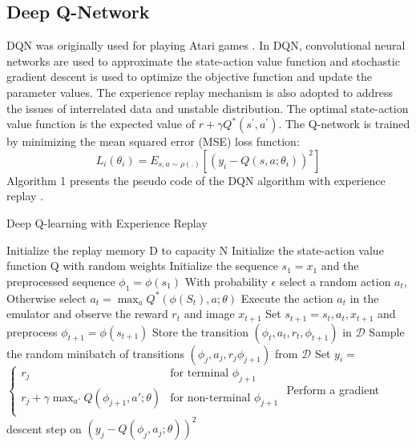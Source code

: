 \documentclass[journal]{IEEEtran}
\begin{document}
\subsection{Deep Q-Network}

DQN was originally used for playing Atari games \cite{mnih2013playing}. In DQN, convolutional neural networks are used to approximate the state-action value function and stochastic gradient descent is used to optimize the objective function and update the parameter values. The experience replay mechanism is also adopted to address the issues of interrelated data and unstable distribution. The optimal state-action value function is the expected value of $r + \gamma Q^{*}(s^{'} , a^{'})$. 
The Q-network is trained by minimizing the mean squared error (MSE) loss function:
\begin{equation}
{{L}_{i}}({{\theta }_{i}})={{E}_{s,a \sim \rho (.)}}\left[ {{({{y}_{i}}-Q(s,a;{{\theta }_{i}}))}^{2}} \right]
\label{eq3}
\end{equation}
Algorithm 1 presents the pseudo code of the DQN algorithm with experience replay \cite{mnih2013playing}.

\begin{algorithm*}[!h]

    \begin{algorithmic}[1]

        \caption{Deep Q-learning with Experience Replay \cite{mnih2013playing}} \label{algorithm: cds bw}
        \State Initialize the replay memory D to capacity N
        \State Initialize the state-action value function Q with random weights
        		\State Initialize the sequence ${s_1}={x_1}$ and the preprocessed       		
        		sequence 
        		  $\phi_1=\phi(s_1)$		 
            \State With probability $\epsilon$ select a random action $a_t$,
            \State Otherwise select $ {{a}_{t}}={{\max }_{a}}{{Q}^{*}}\left( \phi \left( {{S}_{t}} \right),a;					  \theta \right)$
            \State Execute the action $a_t$ in the emulator and observe the reward $r_t$ and image $x_{t+1}$
            \State Set $s_{t+1}=s_{t},a_{t},x_{t+1}$ and preprocess $\phi_{t+1}=\phi(s_{t+1})$
 						\State Store the transition $(\phi_{t},a_{t},r_{t},\phi_{t+1})$ in $\mathcal{D}$
            \State Sample the random minibatch of transitions $(\phi_{j},a_{j},r_{j}\phi_{j+1})$ from $\mathcal{D}$
             \State Set ${{y}_{i}}=$                    $\left\{\begin{matrix} {{r}_{j}} & \text{for terminal }{{\phi }_{j+1}}  \\ 
{{r}_{j}}+\gamma {{\max }_{{{a}'}}}Q\left( {{\phi }_{j+1}},{a}';\theta  \right) & \text{for non-terminal }{{\phi }_{j+1}}  \\ 
									\end{matrix}\right. $
						\State Perform a gradient descent step on ${{({{y}_{j}}-Q({{\phi }_{j}},{{a}_{j}};\theta ))}^{2}}$ 
        \EndFor
    \EndFor             
    \end{algorithmic}
\end{algorithm*}
\end{document}

